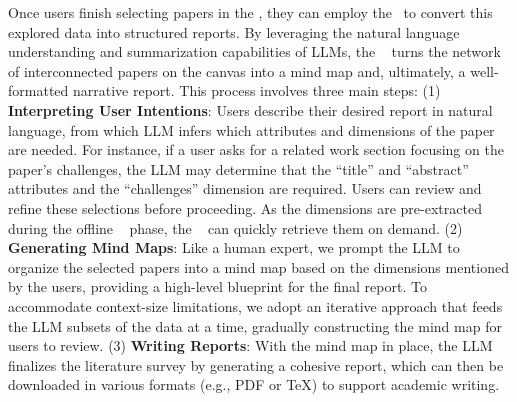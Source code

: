  Once users finish selecting papers in the \explorer, they can employ the \generator~to convert this explored data into structured reports. By leveraging the natural language understanding and summarization capabilities of LLMs, the \generator~ turns the network of interconnected papers on the canvas into a mind map and, ultimately, a well-formatted narrative report. This process involves three main steps: (1) \textbf{Interpreting User Intentions}: Users describe their desired report in natural language, from which LLM infers which attributes and dimensions of the paper are needed. For instance, if a user asks for a related work section focusing on the paper’s challenges, the LLM may determine that the ``title'' and ``abstract'' attributes and the ``challenges'' dimension are required. Users can review and refine these selections before proceeding. As the dimensions are pre-extracted during the offline \scrapper~ phase, the \generator~ can quickly retrieve them on demand.
(2) \textbf{Generating Mind Maps}: Like a human expert, we prompt the LLM to organize the selected papers into a mind map based on the dimensions mentioned by the users, providing a high-level blueprint for the final report. To accommodate context-size limitations, we adopt an iterative approach that feeds the LLM subsets of the data at a time, gradually constructing the mind map for users to review. %
(3) \textbf{Writing Reports}: With the mind map in place, the LLM finalizes the literature survey by generating a cohesive report, which can then be downloaded in various formats (e.g., PDF or TeX) to support academic writing.
